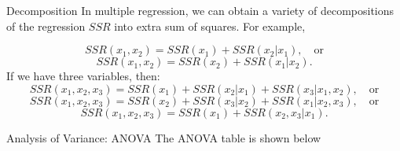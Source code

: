 \documentclass[
  ignorenonframetext,
]{beamer}
\begin{document}
\begin{frame}{Decomposition}
\label{decomposition}
In multiple regression, we can obtain a variety of decompositions of the
regression \(SSR\) into extra sum of squares. For example,

\[SSR(x_1, x_2)=SSR(x_1)+SSR(x_2|x_1), \quad \text{or}\]
\[SSR(x_1, x_2)=SSR(x_2)+SSR(x_1|x_2).\] If we have three variables,
then:
\[SSR(x_1, x_2,x_3)=SSR(x_1)+SSR(x_2|x_1)+SSR(x_3|x_1,x_2), \quad \text{or}\]
\[SSR(x_1, x_2,x_3)=SSR(x_2)+SSR(x_3|x_2)+SSR(x_1|x_2,x_3), \quad \text{or}\]
\[SSR(x_1, x_2,x_3)=SSR(x_1)+SSR(x_2,x_3|x_1).\]
\end{frame}

\begin{frame}{Analysis of Variance: ANOVA}
\label{analysis-of-variance-anova}
The ANOVA table is shown below

\begin{table}[h]
\centering
{}
\end{table}
\end{frame}
\end{document}
